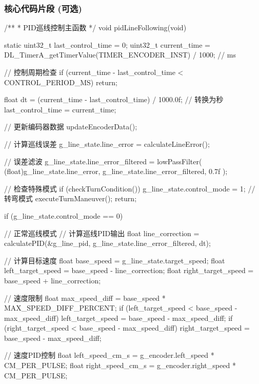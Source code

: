 \documentclass[UTF-8,zihao=-4]{ctexart}
\begin{document}
\subsubsection{核心代码片段 (可选)}
/**
 * PID巡线控制主函数
 */
void pidLineFollowing(void) {
    static uint32_t last_control_time = 0;
    uint32_t current_time = DL_TimerA_getTimerValue(TIMER_ENCODER_INST) / 1000; // ms
    
    // 控制周期检查
    if (current_time - last_control_time < CONTROL_PERIOD_MS) {
        return;
    }
    
    float dt = (current_time - last_control_time) / 1000.0f; // 转换为秒
    last_control_time = current_time;
    
    // 更新编码器数据
    updateEncoderData();
    
    // 计算巡线误差
    g_line_state.line_error = calculateLineError();
    
    // 误差滤波
    g_line_state.line_error_filtered = lowPassFilter(
        (float)g_line_state.line_error, 
        g_line_state.line_error_filtered, 
        0.7f
    );
    
    // 检查特殊模式
    if (checkTurnCondition()) {
        g_line_state.control_mode = 1; // 转弯模式
        executeTurnManeuver();
        return;
    }
    
    if (g_line_state.control_mode == 0) { // 正常巡线模式
        // 计算巡线PID输出
        float line_correction = calculatePID(&g_line_pid, g_line_state.line_error_filtered, dt);
        
        // 计算目标速度
        float base_speed = g_line_state.target_speed;
        float left_target_speed = base_speed - line_correction;
        float right_target_speed = base_speed + line_correction;
        
        // 速度限制
        float max_speed_diff = base_speed * MAX_SPEED_DIFF_PERCENT;
        if (left_target_speed < base_speed - max_speed_diff) {
            left_target_speed = base_speed - max_speed_diff;
        }
        if (right_target_speed < base_speed - max_speed_diff) {
            right_target_speed = base_speed - max_speed_diff;
        }
        
        // 速度PID控制
        float left_speed_cm_s = g_encoder.left_speed * CM_PER_PULSE;
        float right_speed_cm_s = g_encoder.right_speed * CM_PER_PULSE;
        
}}
\end{document}
